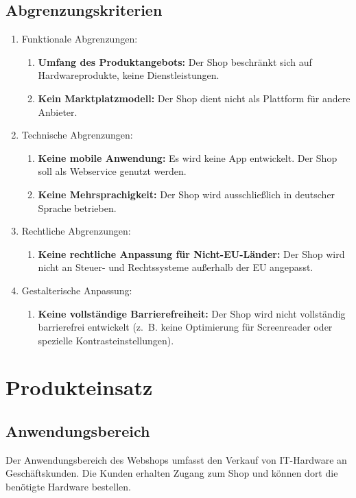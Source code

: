 \documentclass[%
	12pt,
	a4paper,
	oneside,
	parskip=full
]{scrbook}
\begin{document}
\section{Abgrenzungskriterien}
\begin{enumerate}
	\item Funktionale Abgrenzungen:
	\begin{enumerate}
		\item \textbf{Umfang des Produktangebots:} Der Shop beschränkt sich auf Hardwareprodukte, keine Dienstleistungen.
		\item \textbf{Kein Marktplatzmodell:} Der Shop dient nicht als Plattform für andere Anbieter.
	\end{enumerate}
	\item Technische Abgrenzungen:
	\begin{enumerate}
		\item \textbf{Keine mobile Anwendung:} Es wird keine App entwickelt. Der Shop soll als Webservice genutzt werden.
		\item \textbf{Keine Mehrsprachigkeit:} Der Shop wird ausschließlich in deutscher Sprache betrieben.
	\end{enumerate}
	\item Rechtliche Abgrenzungen:
	\begin{enumerate}
		\item \textbf{Keine rechtliche Anpassung für Nicht-EU-Länder:} Der Shop wird nicht an Steuer- und Rechtssysteme außerhalb der EU angepasst.
	\end{enumerate}
	\item Gestalterische Anpassung:
	\begin{enumerate}
		\item \textbf{Keine vollständige Barrierefreiheit:} Der Shop wird nicht vollständig barrierefrei entwickelt (z.~B. keine Optimierung für Screenreader oder spezielle Kontrasteinstellungen).
	\end{enumerate}
\end{enumerate}

\chapter{Produkteinsatz}
\section{Anwendungsbereich}
Der Anwendungsbereich des Webshops umfasst den Verkauf von IT-Hardware an Geschäftskunden.
Die Kunden erhalten Zugang zum Shop und können dort die benötigte Hardware bestellen.
\end{document}
